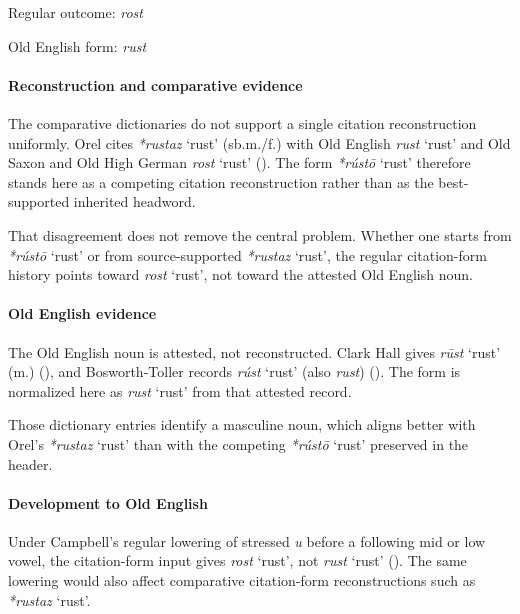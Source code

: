 \documentclass[
  british,
  a4paper,
]{article}
\providecommand{\Recon}[1]{\emph{*#1}}
\begin{document}
Regular outcome: \emph{rost}

Old English form: \emph{rust}

\paragraph{Reconstruction and comparative
evidence}\label{reconstruction-and-comparative-evidence-151}

The comparative dictionaries do not support a single citation
reconstruction uniformly. Orel cites \Recon{rustaz} `rust' (sb.m./f.)
with Old English {\emph{rust}} `rust' and Old Saxon and Old High German
\emph{rost} `rust' (). The form
\Recon{rústō} `rust' therefore stands here as a competing citation
reconstruction rather than as the best-supported inherited headword.

That disagreement does not remove the central problem. Whether one
starts from \Recon{rústō} `rust' or from source-supported \Recon{rustaz}
`rust', the regular citation-form history points toward \emph{rost}
`rust', not toward the attested Old English noun.

\paragraph{Old English evidence}\label{old-english-evidence-151}

The Old English noun is attested, not reconstructed. Clark Hall gives
{\emph{rūst}} `rust' (m.) (), and Bosworth-Toller records {\emph{rúst}} `rust' (also
\emph{rust}) (). The form is normalized here as {\emph{rust}} `rust' from
that attested record.

Those dictionary entries identify a masculine noun, which aligns better
with Orel's \Recon{rustaz} `rust' than with the competing \Recon{rústō}
`rust' preserved in the header.

\paragraph{Development to Old
English}\label{development-to-old-english-151}

Under Campbell's regular lowering of stressed \emph{u} before a
following mid or low vowel, the citation-form input gives \emph{rost}
`rust', not {\emph{rust}} `rust' (). The same lowering would also affect comparative
citation-form reconstructions such as \Recon{rustaz} `rust'.
\end{document}
